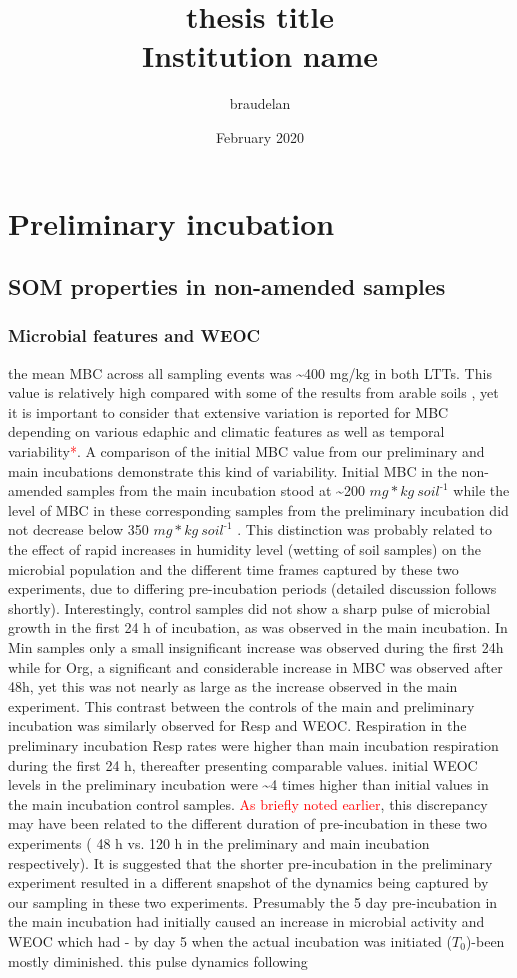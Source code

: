 \documentclass[12pt]{report}
\title{
    {thesis title}\\
    {\large Institution name}\\
}
\author{braudelan }
\date{February 2020}
\newcommand{\myRed}[1]{\textcolor{red}{#1}} %
\newlength{\SpaceAfterUnit}
\newcommand{\genericunit}{$ mg * kg\ soil^{\text{-}1}$ \hspace*{\SpaceAfterUnit}}
\begin{document}


\section{Preliminary incubation}

\subsection{SOM properties in non-amended samples}

\subsubsection{Microbial features and WEOC}		
the mean MBC across all sampling events was \~{}400 mg/kg in both LTTs. This value is relatively high compared with some of the results from arable soils \citep{jat2020, haynes1999,garcia-orenes2010}, yet it is important to consider that extensive variation is reported for MBC depending on various edaphic and climatic features as well as temporal variability\myRed{*}. A comparison of the initial MBC value from our preliminary and main incubations demonstrate this kind of variability. Initial MBC in the non-amended samples from the main incubation stood at \~{}200 \genericunit while the level of MBC in these corresponding samples from the preliminary incubation did not decrease below 350 \genericunit. This distinction was probably related to the effect of rapid increases in humidity level (wetting of soil samples) on the microbial population and the different time frames captured by these two experiments, due to differing pre-incubation periods (detailed discussion follows shortly). Interestingly, control samples did not show a sharp pulse of microbial growth in the first 24 h of incubation, as was observed in the main incubation. In Min samples only a small insignificant increase was observed during the first 24h while for Org, a significant and considerable increase in MBC was observed after 48h, yet this was  not nearly as large as the increase observed in the main experiment. This contrast between the controls of the main and preliminary incubation was similarly observed for Resp and WEOC. Respiration in the preliminary incubation Resp rates were higher than main incubation respiration during the first 24 h, thereafter presenting comparable values. initial WEOC levels in the preliminary incubation were \~{}4 times higher than initial values in the main incubation control samples. \myRed{As briefly noted earlier}, this discrepancy may have been related to the different duration of pre-incubation in these two experiments ( 48 h vs. 120 h in the preliminary and main incubation respectively). It is suggested that the shorter pre-incubation in the preliminary experiment resulted in a different snapshot of the dynamics being captured by our sampling in these two experiments. Presumably the 5 day pre-incubation in the main incubation had initially caused an increase in microbial activity and WEOC which had - by day 5 when the actual incubation was initiated ($ T_0 $)-been mostly diminished. this pulse dynamics following 
\end{document}
